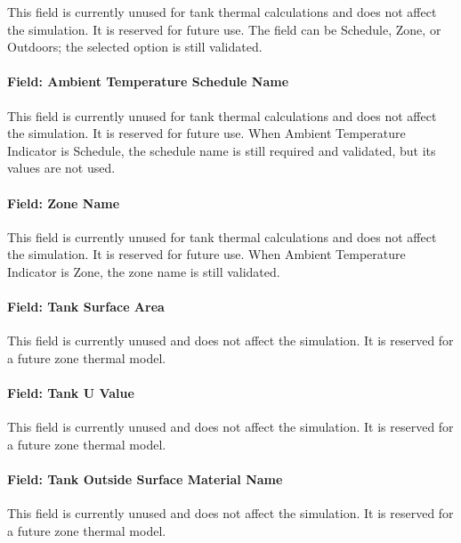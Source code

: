 This field is currently unused for tank thermal calculations and does not affect the simulation. It is reserved for future use. The field can be Schedule, Zone, or Outdoors; the selected option is still validated.

\paragraph{Field: Ambient Temperature Schedule Name}\label{field-ambient-temperature-schedule-name-002}

This field is currently unused for tank thermal calculations and does not affect the simulation. It is reserved for future use. When Ambient Temperature Indicator is Schedule, the schedule name is still required and validated, but its values are not used.

\paragraph{Field: Zone Name}\label{field-zone-name-1-010}

This field is currently unused for tank thermal calculations and does not affect the simulation. It is reserved for future use. When Ambient Temperature Indicator is Zone, the zone name is still validated.

\paragraph{Field: Tank Surface Area}\label{field-tank-surface-area}

This field is currently unused and does not affect the simulation. It is reserved for a future zone thermal model.

\paragraph{Field: Tank U Value}\label{field-tank-u-value}

This field is currently unused and does not affect the simulation. It is reserved for a future zone thermal model.

\paragraph{Field: Tank Outside Surface Material Name}\label{field-tank-outside-surface-material-name}

This field is currently unused and does not affect the simulation. It is reserved for a future zone thermal model.

